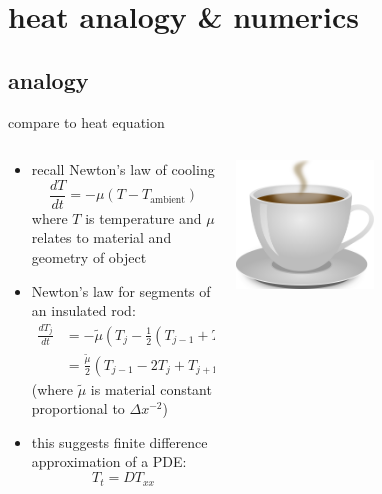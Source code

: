 
\section{heat analogy \& numerics}

\subsection{analogy}

\begin{frame}{compare to heat equation}
\label{slide:heatcompare}

\small
\begin{columns}
\begin{column}{0.6\textwidth}
\begin{itemize}
\item recall Newton's law of cooling
	$$\frac{dT}{dt} = -\mu (T-T_{\text{ambient}})$$
where $T$ is temperature and $\mu$ relates to material and geometry of object
\item Newton's law for segments of an insulated rod:
\begin{align*}
\frac{dT_j}{dt} &= -\tilde \mu \left(T_j - \frac{1}{2} (T_{j-1} + T_{j+1}) \right) \\
	&= \frac{\tilde \mu}{2} \left(T_{j-1} - 2 T_j + T_{j+1}\right) 
\end{align*}
(where $\tilde \mu$ is material constant proportional to $\Delta x^{-2}$)
\item this suggests finite difference approximation of a PDE:
	$$T_t = D T_{xx}$$
\end{itemize}
\end{column}
\begin{column}{0.4\textwidth}
\hfill
\includegraphics[width=0.5\textwidth]{pdffigs/coffee}
\vspace{0.7in}

\end{column}
\end{columns}
\end{frame}

